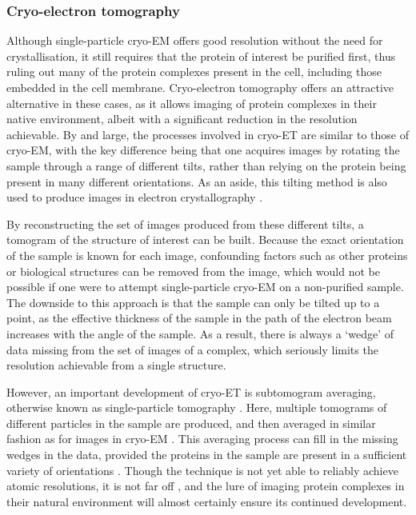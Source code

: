 \documentclass[a4paper,11pt,twoside,openright]{scrbook}
\begin{document}
\subsubsection{Cryo-electron tomography}
Although single-particle cryo-EM offers good resolution without the need for crystallisation, it still requires that the protein of interest be purified first, thus ruling out many of the protein complexes present in the cell, including those embedded in the cell membrane. Cryo-electron tomography offers an attractive alternative in these cases, as it allows imaging of protein complexes in their native environment, albeit with a significant reduction in the resolution achievable. By and large, the processes involved in cryo-ET are similar to those of cryo-EM, with the key difference being that one acquires images by rotating the sample through a range of different tilts, rather than relying on the protein being present in many different orientations. As an aside, this tilting method is also used to produce images in electron crystallography \cite{Wisedchaisri2011}.

By reconstructing the set of images produced from these different tilts, a tomogram of the structure of interest can be built. Because the exact orientation of the sample is known for each image, confounding factors such as other proteins or biological structures can be removed from the image, which would not be possible if one were to attempt single-particle cryo-EM on a non-purified sample. The downside to this approach is that the sample can only be tilted up to a point, as the effective thickness of the sample in the path of the electron beam increases with the angle of the sample. As a result, there is always a `wedge' of data missing from the set of images of a complex, which seriously limits the resolution achievable from a single structure.

However, an important development of cryo-ET is subtomogram averaging, otherwise known as single-particle tomography \cite{Galaz-Montoya2017}. Here, multiple tomograms of different particles in the sample are produced, and then averaged in similar fashion as for images in cryo-EM \cite{Bharat2016}. This averaging process can fill in the missing wedges in the data, provided the proteins in the sample are present in a sufficient variety of orientations \cite{Leschziner2006}. Though the technique is not yet able to reliably achieve atomic resolutions, it is not far off \cite{Schur2016}, and the lure of imaging protein complexes in their natural environment will almost certainly ensure its continued development.
\end{document}
